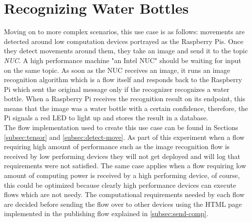 \section{Recognizing Water Bottles } \label{sec:rwb}


Moving on to more complex scenarios, this use case  is as follows: movements are detected around low computation devices portrayed as the Raspberry Pis. Once they detect movements around them, they take an image and send it to the topic \textit{NUC}. A high performance machine "an Intel NUC" should be waiting for input on the same topic. As soon as the NUC  receives an image, it runs an image recognition algorithm which is a flow itself and responds back to the Raspberry Pi which sent the original message  only if the recognizer recognizes a water bottle. When a Raspberry Pi receives the recognition result on its endpoint, this means that the image was a water bottle with a certain confidence, therefore, the Pi signals a red LED to light up and stores the result in a database. \\ 

\noindent The flow implementation used to create this use case can be found in Sections \ref{subsec:tensor} and \ref{subsec:detect-move}.  As part of this experiment when a flow requiring high amount of performance such as the image recognition flow is received by low performing devices they will not get deployed and  will log that requirements were not satisfied. The same case applies when a flow requiring low amount of computing power is received by a high performing device, of course, this could be optimized because clearly high performance devices can execute flows which are not needy. The computational requirements needed by each flow are decided before sending the flow over to other devices using the HTML page implemented in the publishing flow explained in \ref{subsec:send-comp}.\\ 

